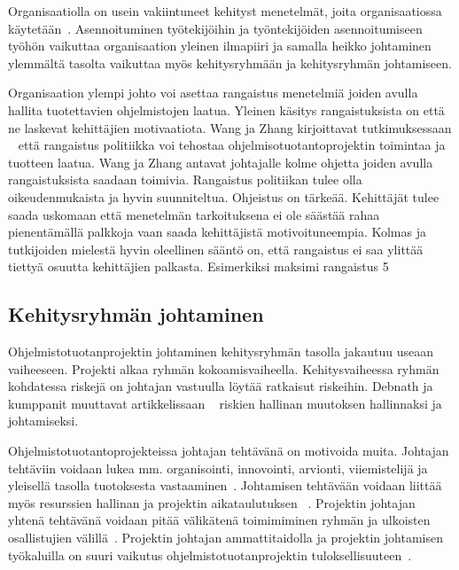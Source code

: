 \documentclass[finnish]{tktltiki2}
\theoremstyle{definition}
\theoremstyle{remark}
\begin{document}
Organisaatiolla on usein vakiintuneet kehityst menetelmät, joita organisaatiossa käytetään~\cite{McLeod:2011:FAS:1978802.1978803}. Asennoituminen työtekijöihin ja työntekijöiden asennoitumiseen työhön vaikuttaa organisaation yleinen ilmapiiri ja samalla heikko johtaminen ylemmältä tasolta vaikuttaa myös kehitysryhmään ja kehitysryhmän johtamiseen.  

Organisaation ylempi johto voi asettaa rangaistus menetelmiä joiden avulla hallita tuotettavien ohjelmistojen laatua. Yleinen käsitys rangaistuksista on että ne laskevat kehittäjien motivaatiota. Wang ja Zhang kirjoittavat tutkimuksessaan ~\cite{Wang:2010:PPP:1810295.1810302} että rangaistus politiikka voi tehostaa ohjelmisotuotantoprojektin toimintaa ja tuotteen laatua. Wang ja Zhang antavat johtajalle kolme ohjetta joiden avulla rangaistuksista saadaan toimivia. Rangaistus politiikan tulee olla oikeudenmukaista ja hyvin suunniteltua. Ohjeistus on tärkeää. Kehittäjät tulee saada uskomaan että menetelmän tarkoituksena ei ole säästää rahaa pienentämällä palkkoja vaan saada kehittäjistä motivoituneempia. Kolmas ja tutkijoiden mielestä hyvin oleellinen sääntö on, että rangaistus ei saa ylittää tiettyä osuutta kehittäjien palkasta. Esimerkiksi maksimi rangaistus 5%



\subsection{Kehitysryhmän johtaminen}

Ohjelmistotuotanprojektin johtaminen kehitysryhmän tasolla jakautuu useaan vaiheeseen. Projekti alkaa ryhmän kokoamisvaiheella. Kehitysvaiheessa ryhmän kohdatessa riskejä on johtajan vastuulla löytää ratkaisut riskeihin. Debnath ja kumppanit muuttavat artikkelissaan ~\cite{4017705} riskien hallinan muutoksen hallinnaksi ja johtamiseksi.  

Ohjelmistotuotantoprojekteissa johtajan tehtävänä on motivoida muita. Johtajan tehtäviin voidaan lukea mm. organisointi, innovointi, arvionti, viiemistelijä  ja yleisellä tasolla tuotoksesta vastaaminen~\cite{4017705}. Johtamisen tehtävään voidaan liittää myös resurssien hallinan ja projektin aikataulutuksen ~\cite{Dhomne:2012:ITL:2382887.2382899}. Projektin johtajan yhtenä tehtävänä voidaan pitää välikätenä toimimiminen ryhmän ja ulkoisten osallistujien välillä~\cite{McLeod:2011:FAS:1978802.1978803}.  Projektin johtajan ammattitaidolla ja projektin johtamisen työkaluilla on suuri vaikutus ohjelmistotuotanprojektin tuloksellisuuteen~\cite{McLeod:2011:FAS:1978802.1978803}. 
\end{document}
